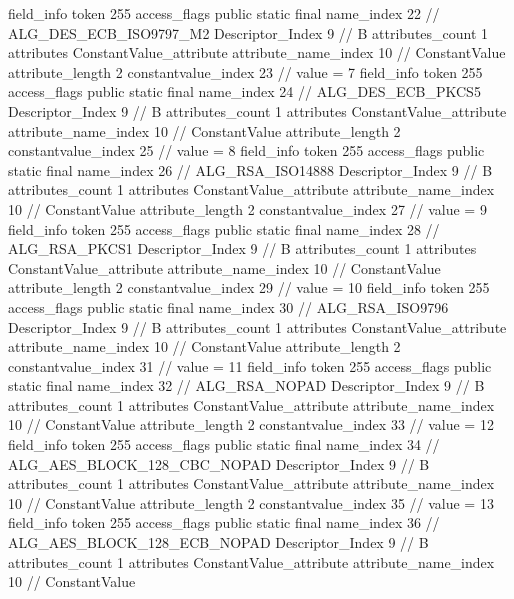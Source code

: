 {{{{			field_info {
				token	255
				access_flags	public static final
				name_index	22		// ALG_DES_ECB_ISO9797_M2
				Descriptor_Index	9		// B
				attributes_count	1
				attributes {
				ConstantValue_attribute {
					attribute_name_index	10		// ConstantValue
					attribute_length	2
					constantvalue_index	23		// value = 7
				}
				}
			}
			field_info {
				token	255
				access_flags	public static final
				name_index	24		// ALG_DES_ECB_PKCS5
				Descriptor_Index	9		// B
				attributes_count	1
				attributes {
				ConstantValue_attribute {
					attribute_name_index	10		// ConstantValue
					attribute_length	2
					constantvalue_index	25		// value = 8
				}
				}
			}
			field_info {
				token	255
				access_flags	public static final
				name_index	26		// ALG_RSA_ISO14888
				Descriptor_Index	9		// B
				attributes_count	1
				attributes {
				ConstantValue_attribute {
					attribute_name_index	10		// ConstantValue
					attribute_length	2
					constantvalue_index	27		// value = 9
				}
				}
			}
			field_info {
				token	255
				access_flags	public static final
				name_index	28		// ALG_RSA_PKCS1
				Descriptor_Index	9		// B
				attributes_count	1
				attributes {
				ConstantValue_attribute {
					attribute_name_index	10		// ConstantValue
					attribute_length	2
					constantvalue_index	29		// value = 10
				}
				}
			}
			field_info {
				token	255
				access_flags	public static final
				name_index	30		// ALG_RSA_ISO9796
				Descriptor_Index	9		// B
				attributes_count	1
				attributes {
				ConstantValue_attribute {
					attribute_name_index	10		// ConstantValue
					attribute_length	2
					constantvalue_index	31		// value = 11
				}
				}
			}
			field_info {
				token	255
				access_flags	public static final
				name_index	32		// ALG_RSA_NOPAD
				Descriptor_Index	9		// B
				attributes_count	1
				attributes {
				ConstantValue_attribute {
					attribute_name_index	10		// ConstantValue
					attribute_length	2
					constantvalue_index	33		// value = 12
				}
				}
			}
			field_info {
				token	255
				access_flags	public static final
				name_index	34		// ALG_AES_BLOCK_128_CBC_NOPAD
				Descriptor_Index	9		// B
				attributes_count	1
				attributes {
				ConstantValue_attribute {
					attribute_name_index	10		// ConstantValue
					attribute_length	2
					constantvalue_index	35		// value = 13
				}
				}
			}
			field_info {
				token	255
				access_flags	public static final
				name_index	36		// ALG_AES_BLOCK_128_ECB_NOPAD
				Descriptor_Index	9		// B
				attributes_count	1
				attributes {
				ConstantValue_attribute {
					attribute_name_index	10		// ConstantValue
}}}}}}}
